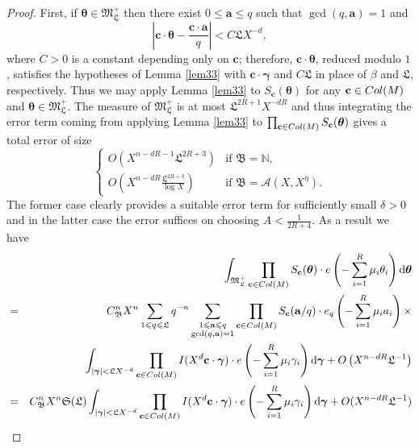 \documentclass[10pt,a4paper]{amsart}
\let\mathcal\mathscr
\numberwithin{equation}{section}
\newcommand{\bgamma}{\boldsymbol{\gamma}}
\newcommand{\btheta}{\boldsymbol{\theta}}
\renewcommand{\a}{\mathbf{a}}
\renewcommand{\c}{\mathbf{c}}
\renewcommand{\leq}{\leqslant}
\begin{document}
\begin{proof}
First, if $\btheta \in \mathfrak{M}_\mathfrak{L}^+$ then there exist $0 \leq \a \leq q$ such that $\gcd(q, \a) = 1$ and
$$
\left| \c \cdot \btheta - \frac{ \c \cdot \a }{q} \right|  < C \mathfrak{L} X^{-d},
$$
where $C > 0$ is a constant depending only on $\c$; therefore, $\c \cdot \btheta$, reduced modulo $1$, satisfies the hypotheses of  Lemma \ref{lem33} with
$\c \cdot \bgamma$ and $C \mathfrak{L}$ in place of $\beta$ and $\mathfrak{L}$, respectively.
Thus we may apply Lemma  \ref{lem33} to $S_\c(\btheta)$ for any $\c \in \textnormal{Col}( M )$ and $\btheta \in \mathfrak{M}_\mathfrak{L}^+$.
The measure of $\mathfrak M_{\mathfrak L}^+$ is at most $\mathfrak L^{2R+1} X^{-dR}$ and thus integrating the error term
coming from applying Lemma \ref{lem33} to
$\prod_{\c \in \textnormal{Col}( M )} S_\c(\btheta)$
gives a total error of size
\[
\begin{cases}
O(X^{n-dR-1} \mathfrak{L}^{2R+3})  &\mbox{if } \mathfrak B = \mathbb N,\\
O(X^{n-dR} \frac{\mathfrak{L}^{2R+3}}{\log X}) &\mbox{if } \mathfrak B = \mathcal A(X, X^\eta).
\end{cases}
\]
The former case clearly provides a suitable error term for sufficiently small $\delta >0$ and in the latter case the error suffices on choosing $A < \frac{1}{2R+4}$.
As a result we have
\begin{eqnarray}
\label{major}
\notag
&&
\int_{  \mathfrak{M}^+_\mathfrak{L}  }  \prod_{\c \in \textnormal{Col}( M )} S_\c(\btheta) \cdot  e \left(-\sum_{i=1}^{R}  \mu_i  \theta_i    \right) \mathrm{d}\btheta
\\
\notag
&=& C_{\mathfrak{B}}^n X^n \sum_{1 \leq q \leq \mathfrak{L}}  q^{- n }  \sum_{ \substack{ 1 \leq  \a \leq  q \\ \gcd(q, \a) = 1  } }
 \prod_{\c \in \textnormal{Col}( M )} S_\c (\a /q)  \cdot e_q \left(-\sum_{i=1}^{R}   \mu_i  a_i   \right) \times
\\
\notag
&&\int_{\vert \bgamma \vert <  \mathfrak{L} X^{-d}}
\prod_{\c \in \textnormal{Col}( M )} I ( X^d \c\cdot\bgamma )  \cdot   e \left(-\sum_{i=1}^{R}  \mu_i  \gamma_i     \right) \mathrm{d}\bgamma
+ O \left(  X^{n  - d R} \mathfrak{L}^{- 1}\right)\\
\notag
&=&
C_{\mathfrak{B}}^n  X^n \mathfrak{S} (\mathfrak{L}) \int_{\vert \bgamma \vert <  \mathfrak{L} X^{-d}}
\prod_{\c \in \textnormal{Col}( M )} I (X^d \c\cdot \bgamma )  \cdot   e \left(-\sum_{i=1}^{R}  \mu_i  \gamma_i    \right) \mathrm{d}\bgamma
+ O ( X^{ n - d R} \mathfrak{L}^{ -1 }  )

\end{eqnarray}
\end{proof}
\end{document}
